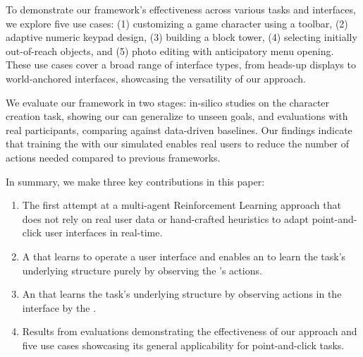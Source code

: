 To demonstrate our framework's effectiveness across various tasks and interfaces, we explore five use cases: (1) customizing a game character using a toolbar, (2) adaptive numeric keypad design, (3) building a block tower, (4) selecting initially out-of-reach objects, and (5) photo editing with anticipatory menu opening. These use cases cover a broad range of interface types, from heads-up displays to world-anchored interfaces, showcasing the versatility of our approach.

We evaluate our framework in two stages: in-silico studies on the character creation task, showing our \interfaceagent can generalize to unseen goals, and evaluations with real participants, comparing \marlui against data-driven baselines. Our findings indicate that training the \interfaceagent with our simulated \useragent enables real users to reduce the number of actions needed compared to previous frameworks.

In summary, we make three key contributions in this paper:
\begin{enumerate}
\item The first attempt at a multi-agent Reinforcement Learning approach that does not rely on real user data or hand-crafted heuristics to adapt point-and-click user interfaces in real-time.
\item A \useragent that learns to operate a user interface and enables an \interfaceagent to learn the task's underlying structure purely by observing the \useragent's actions.
\item An \interfaceagent that learns the task's underlying structure by observing actions in the interface by the \useragent.
\item Results from evaluations demonstrating the effectiveness of our approach and five use cases showcasing its general applicability for point-and-click tasks.
\end{enumerate}
